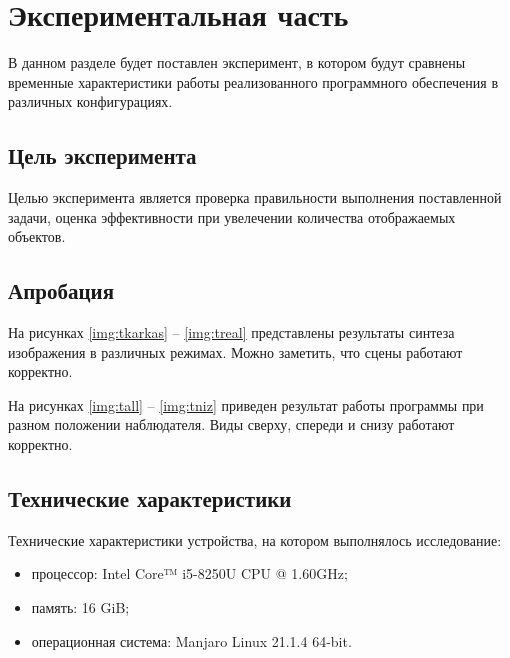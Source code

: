 \chapter{Экспериментальная часть}

В данном разделе будет поставлен эксперимент, в котором будут сравнены временные характеристики работы реализованного программного обеспечения в различных конфигурациях.

\section{Цель эксперимента}

Целью эксперимента является проверка правильности выполнения поставленной задачи, оценка эффективности при увелечении количества отображаемых объектов.

\section{Апробация}

На рисунках \ref{img:tkarkas} -- \ref{img:treal} представлены результаты синтеза изображения в различных режимах. Можно заметить, что сцены работают корректно.





\clearpage
На рисунках \ref{img:tall} -- \ref{img:tniz} приведен результат работы программы при разном положении наблюдателя. Виды сверху, спереди и снизу работают корректно.

\clearpage

\clearpage


\section{Технические характеристики}

Технические характеристики устройства, на котором выполнялось исследование:

\begin{itemize}
	\item процессор: Intel Core™ i5-8250U \cite{i5} CPU @ 1.60GHz;
	\item память: 16 GiB;
	\item операционная система: Manjaro \cite{manjaro} Linux \cite{linux} 21.1.4 64-bit.
\end{itemize}

